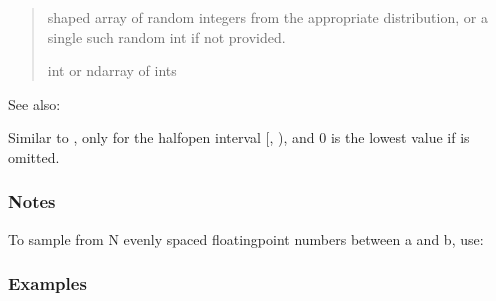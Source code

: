 \documentclass[letterpaper,10pt,english]{sphinxmanual}
\begin{document}
\begin{fulllineitems}
\begin{quote}
\begin{description}
\begin{itemize}
\end{itemize}

\sphinxAtStartPar
{} \textendash{} \sphinxhyphen{}shaped array of random integers from the appropriate
distribution, or a single such random int if  not provided.

\sphinxAtStartPar
int or ndarray of ints

\end{description}\end{quote}


\begin{sphinxseealso}{See also:}
\begin{description}
\sphinxAtStartPar
Similar to , only for the half\sphinxhyphen{}open interval {[}, ), and 0 is the lowest value if  is omitted.

\end{description}


\end{sphinxseealso}

\subsubsection*{Notes}

\sphinxAtStartPar
To sample from N evenly spaced floating\sphinxhyphen{}point numbers between a and b,
use:

\begin{sphinxVerbatim}[commandchars=\\\{\}]
            
\end{sphinxVerbatim}
\subsubsection*{Examples}


\end{fulllineitems}
\end{document}
